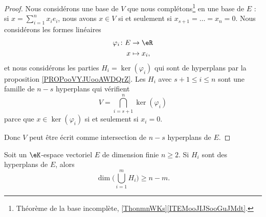 \begin{proof}
	Nous considérons une base de \( V\) que nous complétons\footnote{Théorème de la base incomplète, \ref{ThonmnWKs}\ref{ITEMooJIJSooGuJMdt}.} en une base de \( E\) : si \( x=\sum_{i=1}^nx_ie_i\), nous avons \( x\in V\) si et seulement si \( x_{s+1}=\ldots=x_n=0\). Nous considérons les formes linéaires
	\begin{equation}
		\begin{aligned}
			\varphi_i\colon E & \to \eR      \\
			x                 & \mapsto x_i,
		\end{aligned}
	\end{equation}
	et nous considérons les parties \( H_i=\ker(\varphi_i)\) qui sont de hyperplans par la proposition \ref{PROPooVYJUooAWDQrZ}. Les \( H_i\) avec \( s+1\leq i\leq n\) sont une famille de \( n-s\) hyperplans qui vérifient
	\begin{equation}
		V=\bigcap_{i=s+1}^n\ker(\varphi_i)
	\end{equation}
	parce que \( x\in \ker(\varphi_i)\) si et seulement si \( x_i=0\).

	Donc \( V\) peut être écrit comme intersection de \( n-s\) hyperplans de \( E\).
\end{proof}

\begin{proposition}      \label{PROPooRCLNooJpIMMl}
	Soit un \( \eK\)-espace vectoriel \( E\) de dimension finie \( n\geq 2\). Si \( H_i\) sont des hyperplans de \( E\), alors
	\begin{equation}
		\dim\Big( \bigcup_{i=1}^mH_i \Big)\geq n-m.
	\end{equation}
\end{proposition}

